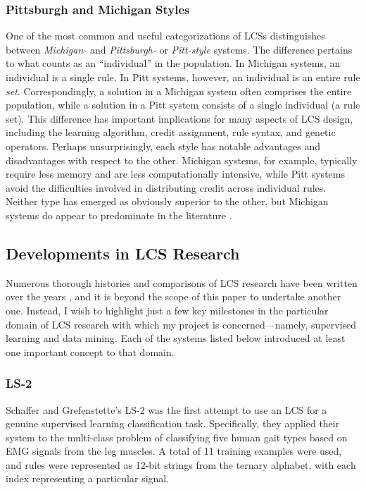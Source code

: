 \documentclass[11pt]{article}
\begin{document}
\subsubsection{Pittsburgh and Michigan Styles}

One of the most common and useful categorizations of LCSs distinguishes between \emph{Michigan-} and \emph{Pittsburgh-} or \emph{Pitt-style} systems. The difference pertains to what counts as an ``individual'' in the population. In Michigan systems, an individual is a single rule. In Pitt systems, however, an individual is an entire rule \emph{set}. Correspondingly, a solution in a Michigan system often comprises the entire population, while a solution in a Pitt system consists of a single individual (a rule set). This difference has important implications for many aspects of LCS design, including the learning algorithm, credit assignment, rule syntax, and genetic operators. Perhaps unsurprisingly, each style has notable advantages and disadvantages with respect to the other. Michigan systems, for example, typically require less memory and are less computationally intensive, while Pitt systems avoid the difficulties involved in distributing credit across individual rules. Neither type has emerged as obviously superior to the other, but Michigan systems do appear to predominate in the literature \cite{urbanowicz_learning_2009}.

\subsection{Developments in LCS Research}

Numerous thorough histories and comparisons of LCS research have been written over the years \cite{urbanowicz_learning_2009, lanzi_roadmap_2000, wilson_critical_1989, wilson_state_2000}, and it is beyond the scope of this paper to undertake another one. Instead, I wish to highlight just a few key milestones in the particular domain of LCS research with which my project is concerned---namely, supervised learning and data mining. Each of the systems listed below introduced at least one important concept to that domain.

\subsubsection{LS-2}

Schaffer and Grefenstette's LS-2 \cite{schaffer_multi-objective_1985} was the first attempt to use an LCS for a genuine supervised learning classification task. Specifically, they applied their system to the multi-class problem of classifying five human gait types based on EMG signals from the leg muscles. A total of 11 training examples were used, and rules were represented as 12-bit strings from the ternary alphabet, with each index representing a particular signal.
\end{document}
